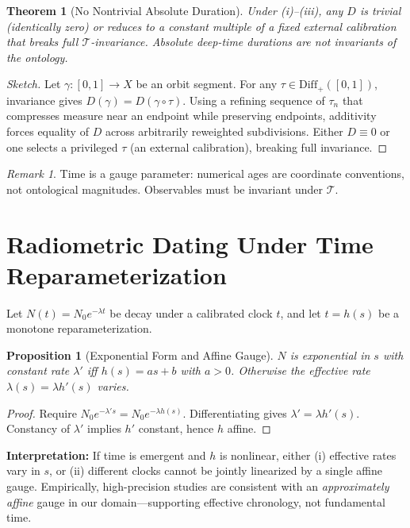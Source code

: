 \documentclass[11pt]{article}
\theoremstyle{definition}
\theoremstyle{plain}
\newtheorem{proposition}[definition]{Proposition}
\newtheorem{theorem}[definition]{Theorem}
\theoremstyle{remark}
\newtheorem{remark}[definition]{Remark}
\begin{document}
\begin{theorem}[No Nontrivial Absolute Duration]\label{thm:no_duration}
Under (i)–(iii), any $D$ is trivial (identically zero) or reduces to a constant multiple of a fixed external calibration that breaks full $\mathcal{T}$-invariance. Absolute deep-time durations are not invariants of the ontology.
\end{theorem}

\begin{proof}[Sketch]
Let $\gamma:[0,1]\to X$ be an orbit segment. For any $\tau\in\mathrm{Diff}_+([0,1])$, invariance gives $D(\gamma)=D(\gamma\circ\tau)$. Using a refining sequence of $\tau_n$ that compresses measure near an endpoint while preserving endpoints, additivity forces equality of $D$ across arbitrarily reweighted subdivisions. Either $D\equiv 0$ or one selects a privileged $\tau$ (an external calibration), breaking full invariance. 
\end{proof}

\begin{remark}
Time is a gauge parameter: numerical ages are coordinate conventions, not ontological magnitudes. Observables must be invariant under $\mathcal{T}$.
\end{remark}

\section{Radiometric Dating Under Time Reparameterization}
Let $N(t)=N_0 e^{-\lambda t}$ be decay under a calibrated clock $t$, and let $t=h(s)$ be a monotone reparameterization.

\begin{proposition}[Exponential Form and Affine Gauge]
$N$ is exponential in $s$ with constant rate $\lambda'$ iff $h(s)=a s+b$ with $a>0$. Otherwise the effective rate $\lambda(s)=\lambda h'(s)$ varies.
\end{proposition}

\begin{proof}
Require $N_0 e^{-\lambda' s}=N_0 e^{-\lambda h(s)}$. Differentiating gives $\lambda'=\lambda h'(s)$. Constancy of $\lambda'$ implies $h'$ constant, hence $h$ affine.
\end{proof}

\noindent \textbf{Interpretation:} If time is emergent and $h$ is nonlinear, either (i) effective rates vary in $s$, or (ii) different clocks cannot be jointly linearized by a single affine gauge. Empirically, high-precision studies are consistent with an \emph{approximately affine} gauge in our domain—supporting effective chronology, not fundamental time.
\end{document}
